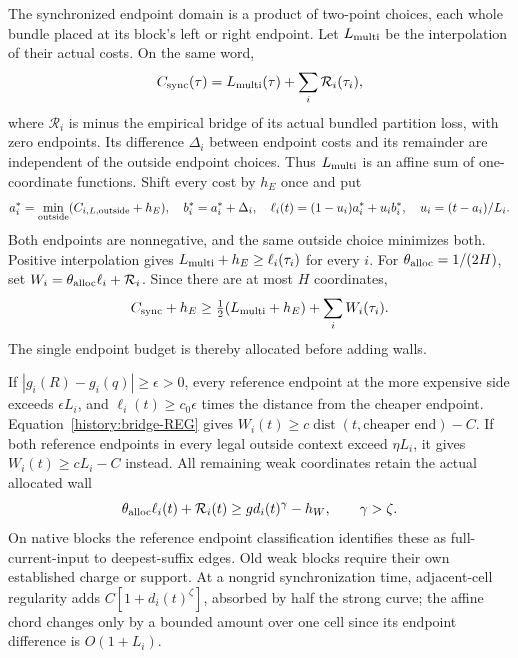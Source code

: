 The synchronized endpoint domain is a product of two-point choices,
each whole bundle placed at its block's left or right endpoint. Let
$L_{\rm multi}$ be the interpolation of their actual costs. On the
same word,
\[
 C_{\rm sync}(\tau)=L_{\rm multi}(\tau)+\sum_i\mathcal R_i(\tau_i),
\]
where $\mathcal R_i$ is minus the empirical bridge of its actual
bundled partition loss, with zero endpoints. Its difference $\Delta_i$
between endpoint costs and its remainder are independent of the
outside endpoint choices. Thus $L_{\rm multi}$ is an affine sum of
one-coordinate functions. Shift every cost by $h_E$ once and put
\[
 a_i^*=\min_{\rm outside}(C_{i,L,\rm outside}+h_E),
 \quad b_i^*=a_i^*+\Delta_i,\quad
 \ell_i(t)=(1-u_i)a_i^*+u_i b_i^*,\quad u_i=(t-a_i)/L_i.
\]
Both endpoints are nonnegative, and the same outside choice minimizes
both. Positive interpolation gives
$L_{\rm multi}+h_E\ge\ell_i(\tau_i)$ for every $i$.
For $\theta_{\rm alloc}=1/(2H)$, set
$W_i=\theta_{\rm alloc}\ell_i+\mathcal R_i$. Since there are at
most $H$ coordinates,
\begin{equation}
 C_{\rm sync}+h_E\ge\tfrac12(L_{\rm multi}+h_E)
                                      +\sum_iW_i(\tau_i).
 \label{history:shared-budget}
\end{equation}
The single endpoint budget is thereby allocated before adding walls.

If $|g_i(R)-g_i(q)|\ge\epsilon>0$, every reference endpoint at
the more expensive side exceeds $\epsilon L_i$, and
$\ell_i(t)\ge c_0\epsilon$ times the distance from the cheaper
endpoint. Equation~\eqref{history:bridge-REG} gives
$W_i(t)\ge c\operatorname{dist}(t,\text{cheaper end})-C$.
If both reference endpoints in every legal outside context exceed
$\eta L_i$, it gives $W_i(t)\ge cL_i-C$ instead.
All remaining weak coordinates retain the actual allocated wall
\begin{equation}
 \theta_{\rm alloc}\ell_i(t)+\mathcal R_i(t)
                    \ge gd_i(t)^\gamma-h_W,\qquad\gamma>\zeta.
 \label{history:allocated-wall}
\end{equation}
On native blocks the reference endpoint classification identifies
these as full-current-input to deepest-suffix edges. Old weak blocks
require their own established charge or support. At a nongrid
synchronization time, adjacent-cell regularity adds
$C[1+d_i(t)^\zeta]$, absorbed by half the strong curve; the affine
chord changes only by a bounded amount over one cell since its
endpoint difference is $O(1+L_i)$.

